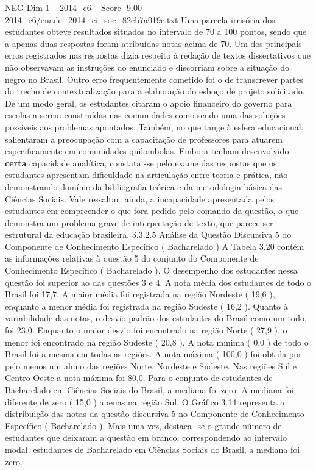 \begin{textsample}{NEG Dim 1 – 2014\_c6 – Score -9.00 – 2014\_c6/enade\_2014\_ci\_soc\_82cb7a019c.txt}
Uma parcela irrisória dos estudantes obteve resultados situados no intervalo de 70 a 100 pontos, sendo que a apenas duas respostas foram atribuídas notas acima de 70.
Um dos principais erros registrados nas respostas dizia respeito à redação de textos dissertativos que não observavam as instruções do enunciado e discorriam sobre a situação do negro no Brasil.
Outro erro frequentemente cometido foi o de transcrever partes do trecho de contextualização para a elaboração do esboço de projeto solicitado.
De um modo geral, os estudantes citaram o apoio financeiro do governo para escolas a serem construídas nas comunidades como sendo uma das soluções possíveis aos problemas apontados.
Também, no que tange à esfera educacional, salientaram a preocupação com a capacitação de professores para atuarem especificamente em comunidades quilombolas.
Embora tenham desenvolvido \textbf{certa} capacidade analítica, constata -se pelo exame das respostas que os estudantes apresentam dificuldade na articulação entre teoria e prática, não demonstrando domínio da bibliografia teórica e da metodologia básica das Ciências Sociais.
Vale ressaltar, ainda, a incapacidade apresentada pelos estudantes em compreender o que fora pedido pelo comando da questão, o que demonstra um problema grave de interpretação de texto, que parece ser estrutural da educação brasileira. 3.3.2.5 Análise da Questão Discursiva 5 do Componente de Conhecimento Específico ( Bacharelado ) A Tabela 3.20 contém as informações relativas à questão 5 do conjunto do Componente de Conhecimento Específico ( Bacharelado ).
O desempenho dos estudantes nessa questão foi superior ao das questões 3 e 4.
A nota média dos estudantes de todo o Brasil foi 17,7.
A maior média foi registrada na região Nordeste ( 19,6 ), enquanto a menor média foi registrada na região Sudeste ( 16,2 ).
Quanto à variabilidade das notas, o desvio padrão dos estudantes do Brasil como um todo, foi 23,0.
Enquanto o maior desvio foi encontrado na região Norte ( 27,9 ), o menor foi encontrado na região Sudeste ( 20,8 ).
A nota mínima ( 0,0 ) de todo o Brasil foi a mesma em todas as regiões.
A nota máxima ( 100,0 ) foi obtida por pelo menos um aluno das regiões Norte, Nordeste e Sudeste.
Nas regiões Sul e Centro-Oeste a nota máxima foi 80,0.
Para o conjunto de estudantes de Bacharelado em Ciências Sociais do Brasil, a mediana foi zero.
A mediana foi diferente de zero ( 15,0 ) apenas na região Sul.
O Gráfico 3.14 representa a distribuição das notas da questão discursiva 5 no Componente de Conhecimento Específico ( Bacharelado ).
Mais uma vez, destaca -se o grande número de estudantes que deixaram a questão em branco, correspondendo ao intervalo modal. estudantes de Bacharelado em Ciências Sociais do Brasil, a mediana foi zero.

\end{textsample}
